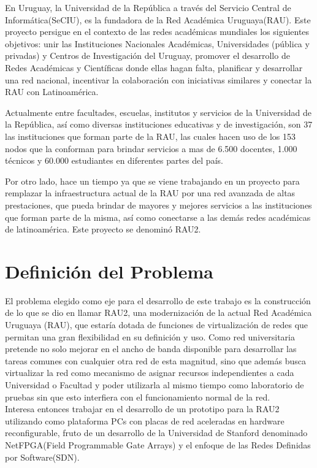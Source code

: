 En Uruguay, la Universidad de la República a través del Servicio Central de Informática(SeCIU), es la fundadora de la Red Académica Uruguaya(RAU). Este proyecto persigue en el contexto de las redes académicas mundiales los siguientes objetivos: unir las Instituciones Nacionales Académicas, Universidades (pública y privadas) y Centros de Investigación del Uruguay, promover el desarrollo de Redes Académicas y Científicas donde ellas hagan falta, planificar y desarrollar una red nacional, incentivar la colaboración con iniciativas similares y conectar la RAU con Latinoamérica. 

Actualmente entre facultades, escuelas, institutos y servicios de la Universidad de la República, así como diversas instituciones educativas y de investigación, son 37 las instituciones que forman parte de la RAU, las cuales hacen uso de los 153 nodos que la conforman para brindar servicios a mas de 6.500 docentes, 1.000 técnicos y 60.000 estudiantes en diferentes partes del país.

Por otro lado, hace un tiempo ya que se viene trabajando en un proyecto para remplazar la infraestructura actual de la RAU por una red avanzada de altas prestaciones, que pueda brindar de mayores y mejores servicios a las instituciones que forman parte de la misma, así como conectarse a las demás redes académicas de latinoam\'erica. Este proyecto se denomin\'o RAU2.  

\section{Definición del Problema}

El problema elegido como eje para el desarrollo de este trabajo es la 
construcción de lo que se dio en llamar RAU2, una modernización de la actual Red Académica Uruguaya (RAU), que estaría dotada de funciones de virtualización de redes que permitan una gran flexibilidad en su definición y uso. Como red universitaria pretende no solo mejorar en el ancho de banda disponible para desarrollar las tareas comunes con cualquier otra red de esta magnitud, sino que además busca virtualizar la red como mecanismo de asignar recursos independientes a cada Universidad o Facultad y poder utilizarla al mismo tiempo como laboratorio de pruebas sin que esto interfiera con el funcionamiento normal de la red.\\

Interesa entonces trabajar en el desarrollo de un prototipo para la RAU2 utilizando como plataforma PCs con placas de red aceleradas en hardware reconfigurable, fruto de un desarrollo de la Universidad de Stanford denominado NetFPGA(Field Programmable Gate Arrays)\citep{NetFPGA} y el enfoque de las Redes Definidas por Software(SDN)\citep{gude2008nox}\citep{SDNReadingList}.

